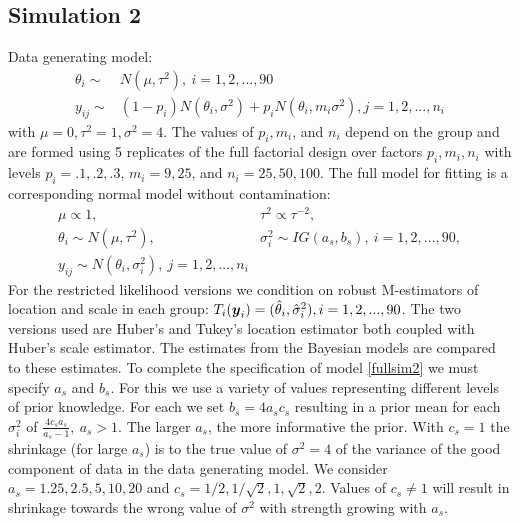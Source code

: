 \documentclass[12pt]{article}
\newcommand{\by}{\mbox{\boldmath $y$}}
\begin{document}
\subsection{Simulation 2}
Data generating model:
\begin{equation}
\label{gensim2}
\begin{split}
\theta_{i}  \sim &  N(\mu, \tau^{2}),  \ i = 1, 2, \dots, 90  \\ 
y_{ij} \sim & (1-p_{i})N(\theta_{i}, \sigma^{2}) + p_{i}N(\theta_{i}, m_{i}\sigma^{2}), j = 1, 2,..., n_{i}
\end{split}
\end{equation}
with $\mu = 0, \tau^{2} = 1, \sigma^{2} = 4$. The values of $p_{i}, m_{i}$, and $n_{i}$ depend on the group and are formed using 5 replicates of the full factorial design over factors $p_{i},m_{i},n_{i}$ with levels $p_{i} = .1, .2, .3$, $m_{i} = 9, 25$, and $n_{i} = 25, 50, 100$. The full model for fitting is a corresponding normal model without contamination:
\begin{equation}
\label{fullsim2}
\begin{split}
\mu \propto 1, \ & \tau^{2} \propto \tau^{-2}, \\
\theta_{i}\sim N(\mu, \tau^{2}), \ & \sigma^{2}_{i} \sim IG(a_{s}, b_{s}),  \ i = 1, 2, \dots, 90, \\ 
y_{ij}\sim  N(\theta_{i},\sigma^{2}_{i}), \ j = 1, 2, \dots, n_{i}
\end{split}
\end{equation}
For the restricted likelihood versions we condition on robust M-estimators of location and scale in each group: $T_{i}(\by_{i}) = (\hat\theta_{i}, \hat\sigma^{2}_{i}), i = 1, 2, ..., 90$. The two versions used are Huber's and Tukey's location estimator both coupled with Huber's scale estimator. The estimates from the Bayesian models are compared to these estimates. To complete the specification of model \eqref{fullsim2} we must specify $a_{s}$ and $b_{s}$. For this we use a variety of values representing different levels of prior knowledge. For each we set $b_{s} = 4a_{s}c_{s}$ resulting in a prior mean for each $\sigma^{2}_{i}$ of $\frac{4c_{s}a_{s}}{a_{s}-1}, \ a_{s} >1$. The larger $a_{s}$, the more informative the prior. With $c_{s} = 1$ the shrinkage (for large $a_{s}$) is to the true value of $\sigma^{2} = 4$ of the variance of the good component of data in the data generating model. We consider $a_{s} = 1.25, 2.5, 5, 10, 20 $ and $c_{s} = 1/2, 1/\sqrt{2}, 1, \sqrt{2}, 2$. Values of $c_{s} \neq 1$ will result in shrinkage towards the wrong value of $\sigma^{2}$ with strength growing with $a_{s}$.
\end{document}
